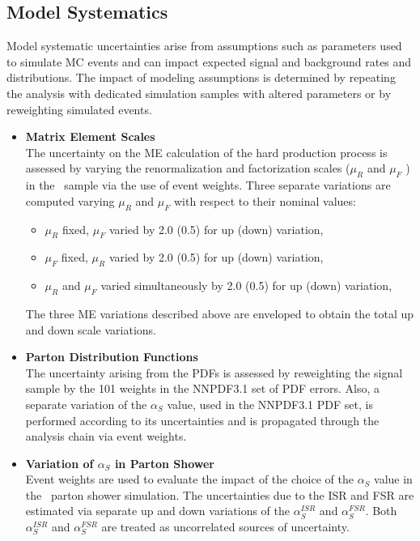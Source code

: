 \begin{refsection}
\subsection{Model Systematics}
\label{Model_Systematics}
Model systematic uncertainties arise from assumptions such as parameters used to simulate MC events and can impact expected signal and background rates and distributions. 
The impact of modeling assumptions is determined by repeating the analysis with dedicated simulation samples with altered parameters or by reweighting simulated events.
\begin{itemize}
    \item {\bf Matrix Element Scales} \\
    The uncertainty on the ME calculation of the hard production process is assessed by varying the renormalization and factorization scales ($\mu_R$ and $\mu_F$ ) in the \Powheg\ sample via the use of event weights. 
    Three separate variations are computed varying $\mu_R$ and $\mu_F$ with respect to their nominal values:
    \begin{itemize}
        \item $\mu_R$ fixed, $\mu_F$ varied by 2.0 (0.5) for up (down) variation,
        \item $\mu_F$ fixed, $\mu_R$ varied by 2.0 (0.5) for up (down) variation,
        \item $\mu_R$ and $\mu_F$ varied simultaneously by 2.0 (0.5) for up (down) variation,
    \end{itemize} 
    The three ME variations described above are enveloped to obtain the total up and down scale variations.
    \item {\bf Parton Distribution Functions} \\
    The uncertainty arising from the PDFs is assessed by reweighting the \ttbar signal sample by the 101 weights in the NNPDF3.1 set of PDF errors. 
    Also, a separate variation of the $\alpha_S$ value, used in the NNPDF3.1 PDF set, is performed according to its uncertainties and is propagated through the analysis chain via event weights.
    \item {\bf Variation of $\alpha_S$ in Parton Shower} \\
    Event weights are used to evaluate the impact of the choice of the $\alpha_S$ value in the \Pythia\ parton shower simulation.
    The uncertainties due to the ISR and FSR are estimated via separate up and down variations of the $\alpha_S^{ISR}$ and $\alpha_S^{FSR}$. 
    Both $\alpha_S^{ISR}$ and $\alpha_S^{FSR}$ are treated as uncorrelated sources of uncertainty.

\end{itemize}
\end{refsection}
